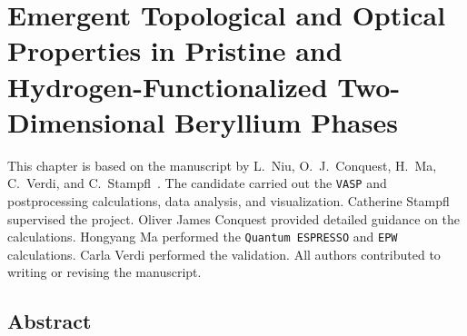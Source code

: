 \chapter[Properties of Pristine and Hydrogenated Beryllene]{Emergent Topological and Optical Properties in Pristine and Hydrogen-Functionalized Two-Dimensional Beryllium Phases}
\label{cha:project_beryllene}

This chapter is based on the manuscript by L.~Niu, O.~J.~Conquest, H.~Ma, C.~Verdi, and C.~Stampfl~\cite{niu2026draftemergent}.
The candidate carried out the \texttt{VASP} and postprocessing calculations, data analysis, and visualization.
Catherine Stampfl supervised the project.
Oliver James Conquest provided detailed guidance on the calculations.
Hongyang Ma performed the \texttt{Quantum ESPRESSO} and \texttt{EPW} calculations.
Carla Verdi performed the validation.
All authors contributed to writing or revising the manuscript.

\section{Abstract}
\label{3_abstract}

